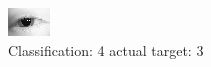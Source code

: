 \begin{figure}[h!]
\begin{center}
\includegraphics[width=0.60\columnwidth]{figures/ID90_class_4_target_3.png}
\end{center}
\caption{ Classification: 4 actual target: 3}
\label{fig:ID90_class_4_target_3}
\end{figure}

